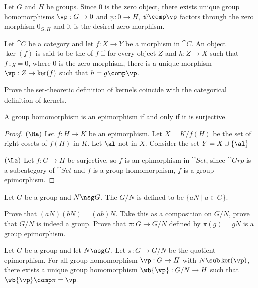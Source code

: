 \documentclass[10pt]{article}
\begin{document}
\par
Let $G$ and $H$ be groups. Since $0$ is the zero object, there exists unique group homomorphisms $\vp:G\to 0$ and $\psi:0\to H$, $\psi\comp\vp$ factors through the zero morphism ${0}_{G,H}$ and it is the desired zero morphism.
\begin{definition}
    Let $\cat{C}$ be a category and let $f:X\to Y$ be a morphism in $\cat{C}$. An object $\ker(f)$ is said to be the  of $f$ if for every object $Z$ and $h:Z\to X$ such that $f\comp g=0$, where $0$ is the zero morphism, there is a unique morphism $\vp:Z\to\ker(f)$ such that $h=g\comp\vp$.
\end{definition}
\begin{problem}
    Prove the set-theoretic definition of kernels coincide with the categorical definition of kernels.
\end{problem}
\begin{proposition}
    A group homomorphism is an epimorphism if and only if it is surjective.    
\end{proposition}
\begin{proof}
    $(\Ra)$ Let $f:H\to K$ be an epimorphism. Let $X=K/f(H)$ be the set of right cosets of $f(H)$ in $K$. Let $\al$ not in $X$. Consider the set $Y=X\cup\{\al\}$



    $(\La)$ Let $f:G\to H$ be surjective, so $f$ is an epimorphism in $\cat{Set}$, since $\cat{Grp}$ is a subcategory of $\cat{Set}$ and $f$ is a group homomorphism, $f$ is a group epimorphism.
\end{proof}
\begin{definition}
    Let $G$ be a group and $N\nsg G$. The  $G/N$ is defined to be $\{aN\mid a\in G\}$. 
\end{definition}
\begin{problem}
    Prove that $(aN)(bN)=(ab)N$. Take this as a composition on $G/N$, prove that $G/N$ is indeed a group. Prove that $\pi:G\to G/N$ defined by $\pi(g)=gN$ is a group epimorphism.
\end{problem}
\begin{Universal property for quotient groups}
    Let $G$ be a group and let $N\nsg G$. Let $\pi:G\to G/N$ be the quotient epimorphism. For all group homomorphism $\vp:G\to H$ with $N\sub\ker(\vp)$, there exists a unique group homomorphism $\wb{\vp}:G/N\to H$ such that $\wb{\vp}\comp\pi=\vp$.
\end{Universal property for quotient groups}
\end{document}
